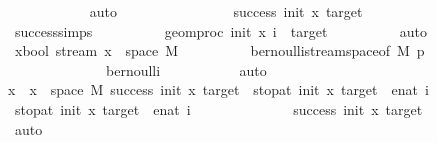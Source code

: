 \begin{isabellebody}
\ \ \ \ \ \ \ \ \ \ \isamarkupfalse%
\ auto\isanewline
\ \ \ \ \ \ \isamarkupfalse%
\isanewline
\ \ \ \ \ \ \isamarkupfalse%
\ \isamarkupfalse%
\ {\isachardoublequoteopen}success\ init\ x\ target{\isachardoublequoteclose}\isanewline
\ \ \ \ \ \ \ \ \isamarkupfalse%
\ success{\isachardot}{\kern0pt}simps\isanewline
\ \ \ \ \ \ \ \ \isamarkupfalse%
\ {\isacartoucheopen}geom{\isacharunderscore}{\kern0pt}proc\ init\ x\ i\ {\isacharequal}{\kern0pt}\ target{\isacartoucheclose}\isanewline
\ \ \ \ \ \ \ \ \isamarkupfalse%
\ auto\isanewline
\ \ \ \ \ \ \isamarkupfalse%
\ \isamarkupfalse%
\ {\isachardoublequoteopen}{\isasymforall}x{\isacharcolon}{\kern0pt}{\isacharcolon}{\kern0pt}bool\ stream{\isachardot}{\kern0pt}\ x\ {\isasymin}\ space\ M{\isachardoublequoteclose}\isanewline
\ \ \ \ \ \ \ \ \isamarkupfalse%
\ bernoulli{\isacharunderscore}{\kern0pt}stream{\isacharunderscore}{\kern0pt}space{\isacharbrackleft}{\kern0pt}of\ M\ p{\isacharbrackright}{\kern0pt}\isanewline
\ \ \ \ \ \ \ \ \ \ \ \ \ \ bernoulli\ \isanewline
\ \ \ \ \ \ \ \ \isamarkupfalse%
\ auto\ \ \ \ \ \ \ \isanewline
\ \ \ \ \ \ \isamarkupfalse%
\ \isamarkupfalse%
{\isachardoublequoteopen}x\ {\isasymin}\ {\isacharbraceleft}{\kern0pt}x\ {\isasymin}\ space\ M{\isachardot}{\kern0pt}\ success\ {\isacharparenleft}{\kern0pt}init{\isacharparenright}{\kern0pt}\ x\ {\isacharparenleft}{\kern0pt}target{\isacharparenright}{\kern0pt}\ {\isasymand}\ stop{\isacharunderscore}{\kern0pt}at\ {\isacharparenleft}{\kern0pt}init{\isacharparenright}{\kern0pt}\ x\ {\isacharparenleft}{\kern0pt}target{\isacharparenright}{\kern0pt}\ {\isacharequal}{\kern0pt}\ enat\ i{\isacharbraceright}{\kern0pt}{\isachardoublequoteclose}\isanewline
\ \ \ \ \ \ \ \ \isamarkupfalse%
\ {\isacartoucheopen}stop{\isacharunderscore}{\kern0pt}at\ {\isacharparenleft}{\kern0pt}init{\isacharparenright}{\kern0pt}\ x\ {\isacharparenleft}{\kern0pt}target{\isacharparenright}{\kern0pt}\ {\isacharequal}{\kern0pt}\ enat\ i{\isacartoucheclose}\isanewline
\ \ \ \ \ \ \ \ \ \ \ \ \ \ {\isacartoucheopen}success\ init\ x\ target{\isacartoucheclose}\isanewline
\ \ \ \ \ \ \ \ \isamarkupfalse%
\ auto\isanewline
\ \ \ \ \isamarkupfalse%
\isanewline
\ \ \isamarkupfalse%
%
\endisatagproof
{\isafoldproof}%
%
\isadelimproof
\isanewline
%
\endisadelimproof
\isanewline
{}\isamarkupfalse%

\end{isabellebody}
